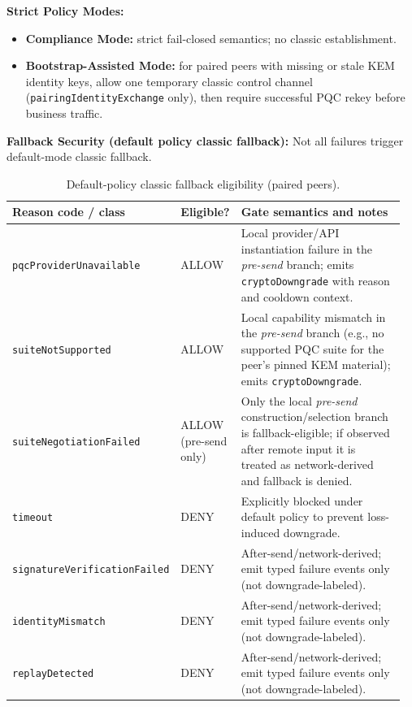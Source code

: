 \documentclass[10pt,journal,compsoc]{IEEEtran}
\providecommand{\tightlist}{%
	  \setlength{\itemsep}{0pt}\setlength{\parskip}{0pt}}
\begin{document}
\textbf{Strict Policy Modes:}
\begin{itemize}\tightlist
\item \textbf{Compliance Mode:} strict fail-closed semantics; no classic
  establishment.
\item \textbf{Bootstrap-Assisted Mode:} for paired peers with missing or
  stale KEM identity keys, allow one temporary classic control channel
  (\texttt{pairingIdentityExchange} only), then require successful PQC
  rekey before business traffic.
\end{itemize}

\textbf{Fallback Security (default policy classic fallback):}
Not all failures trigger default-mode classic fallback.

\begin{table}[!tp]
\centering
\scriptsize
\caption{Default-policy classic fallback eligibility (paired peers).}
\label{tab:supp-default-fallback-eligibility}
\begingroup
\setlength{\tabcolsep}{2pt}
\begin{tabular}{@{}p{0.33\linewidth}p{0.12\linewidth}p{0.51\linewidth}@{}}
\toprule
Reason code / class & Eligible? & Gate semantics and notes \\
\midrule
\texttt{pqcProvider\allowbreak Unavailable} & ALLOW & Local provider/API instantiation failure in the \emph{pre-send} branch; emits \texttt{crypto\allowbreak Downgrade} with reason and cooldown context. \\
\texttt{suiteNot\allowbreak Supported} & ALLOW & Local capability mismatch in the \emph{pre-send} branch (e.g., no supported PQC suite for the peer's pinned KEM material); emits \texttt{crypto\allowbreak Downgrade}. \\
\texttt{suite\allowbreak Negotiation\allowbreak Failed} & ALLOW (pre-send only) & Only the local \emph{pre-send} construction/selection branch is fallback-eligible; if observed after remote input it is treated as network-derived and fallback is denied. \\
\texttt{timeout} & DENY & Explicitly blocked under default policy to prevent loss-induced downgrade. \\
\texttt{signature\allowbreak Verification\allowbreak Failed} & DENY & After-send/network-derived; emit typed failure events only (not downgrade-labeled). \\
\texttt{identity\allowbreak Mismatch} & DENY & After-send/network-derived; emit typed failure events only (not downgrade-labeled). \\
\texttt{replay\allowbreak Detected} & DENY & After-send/network-derived; emit typed failure events only (not downgrade-labeled). \\
\bottomrule
\end{tabular}
\endgroup
\end{table}
\end{document}
